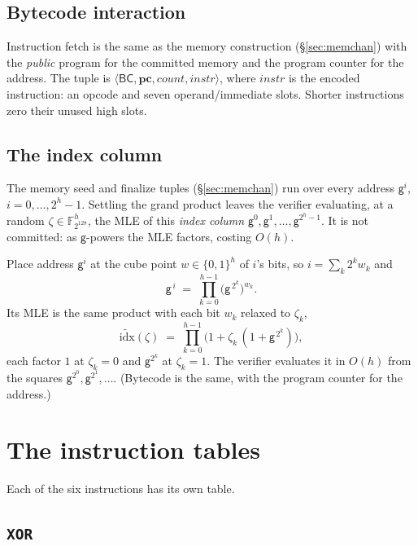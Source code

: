 \documentclass[11pt]{article}
\newcommand{\F}{\mathbb{F}}
\newcommand{\cube}[1]{\{0,1\}^{#1}}
\newcommand{\gen}{\mathsf{g}}
\newcommand{\pc}{\mathbf{pc}}
\newcommand{\cnt}{\mathit{count}}
\newcommand{\tup}[1]{\langle #1 \rangle}
\newcommand{\dsep}[1]{\mathsf{#1}}
\begin{document}
\subsection{Bytecode interaction}\label{sec:bytecode}

Instruction fetch is the same as the memory construction (\S\ref{sec:memchan}) with the \emph{public} program for the committed memory and the program counter for the address. The tuple is $\tup{\dsep{BC},\pc,\cnt,\mathit{instr}}$, where $\mathit{instr}$ is the encoded instruction: an opcode and seven operand/immediate slots. Shorter instructions zero their unused high slots.

\subsection{The index column}\label{sec:idxcol}

The memory seed and finalize tuples (\S\ref{sec:memchan}) run over every address $\gen^{i}$, $i=0,\dots,2^{h}-1$. Settling the grand product leaves the verifier evaluating, at a random $\zeta\in\F_{2^{128}}^{h}$, the MLE of this \emph{index column} $\gen^{0},\gen^{1},\dots,\gen^{2^{h}-1}$. It is not committed: as $\gen$-powers the MLE factors, costing $O(h)$.

Place address $\gen^{i}$ at the cube point $w\in\cube h$ of $i$'s bits, so $i=\sum_k 2^{k}w_k$ and
\[
  \gen^{\,i}\;=\;\prod_{k=0}^{h-1}\bigl(\gen^{\,2^{k}}\bigr)^{w_k}.
\]
Its MLE is the same product with each bit $w_k$ relaxed to $\zeta_k$,
\[
  \widetilde{\mathrm{idx}}(\zeta)\;=\;\prod_{k=0}^{h-1}\bigl(1+\zeta_k\,(1+\gen^{\,2^{k}})\bigr),
\]
each factor $1$ at $\zeta_k=0$ and $\gen^{2^{k}}$ at $\zeta_k=1$. The verifier evaluates it in $O(h)$ from the squares $\gen^{2^{0}},\gen^{2^{1}},\dots$. (Bytecode is the same, with the program counter for the address.)

\section{The instruction tables}\label{sec:tables}

Each of the six instructions has its own table.

\subsection{\texttt{XOR}}\label{sec:tab-xor}
\end{document}
